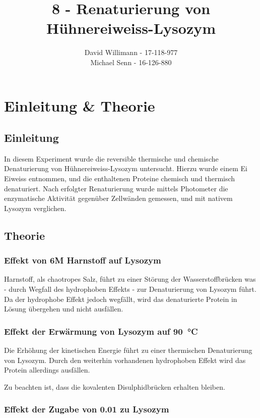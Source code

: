 \documentclass[a4paper,german]{scrreprt}
\title{8 - Renaturierung von Hühnereiweiss-Lysozym}
\author{David Willimann \maillink{david.willimann@students.unibe.ch} - 17-118-977 \\ Michael Senn \maillink{michael.senn@students.unibe.ch} - 16-126-880}
\date{\printdate}
\begin{document}
\maketitle

\chapter{Einleitung \& Theorie}

\section{Einleitung}

In diesem Experiment wurde die reversible thermische und chemische
Denaturierung von Hühnereiweiss-Lysozym untersucht. Hierzu wurde einem Ei
Eiweiss entnommen, und die enthaltenen Proteine chemisch und thermisch
denaturiert. Nach erfolgter Renaturierung wurde mittels Photometer die
enzymatische Aktivität gegenüber Zellwänden gemessen, und mit nativem Lysozym
verglichen.

\section{Theorie}

\subsection{Effekt von 6M Harnstoff auf Lysozym}

Harnstoff, als chaotropes Salz, führt zu einer Störung der Wasserstoffbrücken
was - durch Wegfall des hydrophoben Effekts - zur Denaturierung von Lysozym
führt. Da der hydrophobe Effekt jedoch wegfällt, wird das denaturierte Protein
in Lösung übergehen und nicht ausfällen.

\subsection{Effekt der Erwärmung von Lysozym auf \SI[detect-weight]{90}{\celsius}}

Die Erhöhung der kinetischen Energie führt zu einer thermischen Denaturierung
von Lysozym. Durch den weiterhin vorhandenen hydrophoben Effekt wird das
Protein allerdings ausfällen.

Zu beachten ist, dass die kovalenten Disulphidbrücken erhalten bleiben.

\subsection{Effekt der Zugabe von \SI[detect-weight]{0.01}{\Molar}  zu Lysozym}
\end{document}
